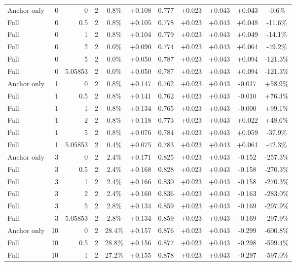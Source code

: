 \begin{table}[htbp]
\begin{tabular}{lrrrccccccc}
Anchor only & 0 & 0 & 2 & 0.8\% & +0.108 & 0.777 & +0.023 & +0.043 & +0.043 & -0.6\% \\
Full & 0 & 0.5 & 2 & 0.8\% & +0.105 & 0.778 & +0.023 & +0.043 & +0.048 & -11.6\% \\
Full & 0 & 1 & 2 & 0.8\% & +0.104 & 0.779 & +0.023 & +0.043 & +0.049 & -14.1\% \\
Full & 0 & 2 & 2 & 0.0\% & +0.090 & 0.774 & +0.023 & +0.043 & +0.064 & -49.2\% \\
Full & 0 & 5 & 2 & 0.0\% & +0.050 & 0.787 & +0.023 & +0.043 & +0.094 & -121.3\% \\
Full & 0 & 5.05853 & 2 & 0.0\% & +0.050 & 0.787 & +0.023 & +0.043 & +0.094 & -121.3\% \\
Anchor only & 1 & 0 & 2 & 0.8\% & +0.147 & 0.762 & +0.023 & +0.043 & -0.017 & +58.9\% \\
Full & 1 & 0.5 & 2 & 0.8\% & +0.141 & 0.762 & +0.023 & +0.043 & -0.010 & +76.3\% \\
Full & 1 & 1 & 2 & 0.8\% & +0.134 & 0.765 & +0.023 & +0.043 & -0.000 & +99.1\% \\
Full & 1 & 2 & 2 & 0.8\% & +0.118 & 0.773 & +0.023 & +0.043 & +0.022 & +48.6\% \\
Full & 1 & 5 & 2 & 0.8\% & +0.076 & 0.784 & +0.023 & +0.043 & +0.059 & -37.9\% \\
Full & 1 & 5.05853 & 2 & 0.4\% & +0.075 & 0.783 & +0.023 & +0.043 & +0.061 & -42.3\% \\
Anchor only & 3 & 0 & 2 & 2.4\% & +0.171 & 0.825 & +0.023 & +0.043 & -0.152 & -257.3\% \\
Full & 3 & 0.5 & 2 & 2.4\% & +0.168 & 0.828 & +0.023 & +0.043 & -0.158 & -270.3\% \\
Full & 3 & 1 & 2 & 2.4\% & +0.166 & 0.830 & +0.023 & +0.043 & -0.158 & -270.3\% \\
Full & 3 & 2 & 2 & 2.4\% & +0.160 & 0.836 & +0.023 & +0.043 & -0.163 & -283.0\% \\
Full & 3 & 5 & 2 & 2.8\% & +0.134 & 0.859 & +0.023 & +0.043 & -0.169 & -297.9\% \\
Full & 3 & 5.05853 & 2 & 2.8\% & +0.134 & 0.859 & +0.023 & +0.043 & -0.169 & -297.9\% \\
Anchor only & 10 & 0 & 2 & 28.4\% & +0.157 & 0.876 & +0.023 & +0.043 & -0.299 & -600.8\% \\
Full & 10 & 0.5 & 2 & 28.8\% & +0.156 & 0.877 & +0.023 & +0.043 & -0.298 & -599.4\% \\
Full & 10 & 1 & 2 & 27.2\% & +0.155 & 0.878 & +0.023 & +0.043 & -0.297 & -597.0\% \\

\end{tabular}
\end{table}
